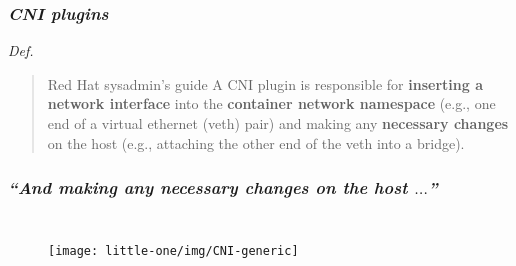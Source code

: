 \begin{frame}
  \frametitle{ \textit{CNI plugins}}
  \vspace{.5em}
  \begin{block}{ \emph{Def.}}
    \begin{quote}{Red Hat sysadmin's guide}
      \vspace{.5em}
      A CNI plugin is responsible for \alert{\textbf{inserting a network interface}} into the
      \alert{\textbf{container network namespace}} (e.g., one end of a virtual ethernet (veth)
      pair) and making any \alert{\textbf{necessary changes}} on the host (e.g., attaching the
      other end of the veth into a bridge).
    \end{quote}
  \end{block}
\end{frame}

\begin{frame}
  \frametitle{  \textit{``And making any necessary changes
      on the host $\dots$''}}
  \begin{columns}

    \vspace{.5em}

    \vspace{.5em}
    \begin{figure}
      \centering
      \texttt{[image: little-one/img/CNI-generic]}
    \end{figure}
  \end{columns}
    \pause
    \pause
    \pause
\end{frame}

